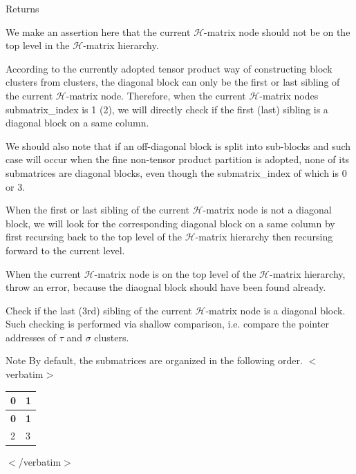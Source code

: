 \begin{DoxyReturn}{Returns}

\end{DoxyReturn}
We make an assertion here that the current $\mathcal{H}$-\/matrix node should not be on the top level in the $\mathcal{H}$-\/matrix hierarchy.

According to the currently adopted tensor product way of constructing block clusters from clusters, the diagonal block can only be the first or last sibling of the current $\mathcal{H}$-\/matrix node. Therefore, when the current $\mathcal{H}$-\/matrix node\textquotesingle{}s {\ttfamily submatrix\+\_\+index} is 1 (2), we will directly check if the first (last) sibling is a diagonal block on a same column.

We should also note that if an off-\/diagonal block is split into sub-\/blocks and such case will occur when the fine non-\/tensor product partition is adopted, none of its submatrices are diagonal blocks, even though the {\ttfamily submatrix\+\_\+index} of which is 0 or 3.

When the first or last sibling of the current $\mathcal{H}$-\/matrix node is not a diagonal block, we will look for the corresponding diagonal block on a same column by first recursing back to the top level of the $\mathcal{H}$-\/matrix hierarchy then recursing forward to the current level.

When the current $\mathcal{H}$-\/matrix node is on the top level of the $\mathcal{H}$-\/matrix hierarchy, throw an error, because the diaognal block should have been found already.

Check if the last (3rd) sibling of the current $\mathcal{H}$-\/matrix node is a diagonal block. Such checking is performed via shallow comparison, i.\+e. compare the pointer addresses of $\tau$ and $\sigma$ clusters.


\begin{DoxyDescription}
\item[Note ]By default, the submatrices are organized in the following order. $<$verbatim$>$ \tabulinesep=1mm
\begin{longtabu} spread 0pt [c]{*{2}{|X[-1]}|}
\hline
\rowcolor{\tableheadbgcolor}\textbf{ 0 }&\textbf{ 1  }\\
\endfirsthead
\hline
\endfoot
\hline
\rowcolor{\tableheadbgcolor}\textbf{ 0 }&\textbf{ 1  }\\
 &3 \\
\end{longtabu}
$<$/verbatim$>$ 
\end{DoxyDescription}

